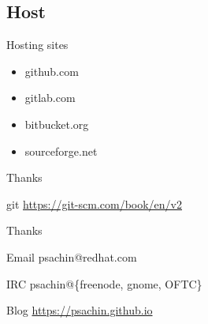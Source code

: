 \documentclass[10pt]{beamer}
\begin{document}
\subsection{Host}
\label{sec:org2fa4c92}
\begin{frame}[label={sec:org834893b}]{Hosting sites}
\begin{itemize}
\item github.com
\item gitlab.com
\item bitbucket.org
\item sourceforge.net
\end{itemize}
\end{frame}

\begin{frame}[label={sec:org6329979}]{Thanks}
\begin{block}{git}
\url{https://git-scm.com/book/en/v2}
\end{block}
\end{frame}

\begin{frame}[label={sec:orgacca45a}]{Thanks}
\begin{block}{Email}
psachin@redhat.com
\end{block}
\begin{block}{IRC}
psachin@\{freenode, gnome, OFTC\}
\end{block}
\begin{block}{Blog}
\url{https://psachin.github.io}
\end{block}
\end{frame}
\end{document}
